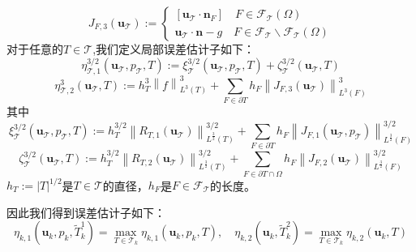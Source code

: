 \documentclass{article}
\begin{document}
\begin{equation*}
J_{F,3}(\boldsymbol{u}_{\mathcal{T}}):=
\begin{cases}
[\boldsymbol{u}_{\mathcal{T}}\cdot\boldsymbol{n}_F]\quad F \in \mathcal{F}_{\mathcal{T}}(\Omega)\\
\boldsymbol{u}_{\mathcal{T}}\cdot\boldsymbol{n}-g\quad F \in \mathcal{F}_{\mathcal{T}}\backslash \mathcal{F}_{\mathcal{T}}(\Omega)
\end{cases}
\end{equation*}
对于任意的$T\in\mathcal{T}$,我们定义局部误差估计子如下：
\begin{equation*}
\eta_{\mathcal{T},1}^{3/2}(\boldsymbol{u}_{\mathcal{T}},p_{\mathcal{T}},T):=\xi_{\mathcal{T}}^{3/2}(\boldsymbol{u}_{\mathcal{T}},p_{\mathcal{T}},T)+\zeta_{\mathcal{T}}^{3/2}(\boldsymbol{u}_{\mathcal{T}},T)
\end{equation*}
\begin{equation*}
\eta_{\mathcal{T},2}^3(\boldsymbol{u}_{\mathcal{T}},T):=h_T^3\left\|f\right\|_{L^3(T)}^3+\sum\limits_{F\in\partial T}h_F\left\|J_{F,3}(\boldsymbol{u}_{\mathcal{T}})\right\|_{L^3(F)}^3
\end{equation*}
其中
\begin{equation*}
\xi_{\mathcal{T}}^{3/2}(\boldsymbol{u}_{\mathcal{T}},p_{\mathcal{T}},T):=h_{T}^{3/2}\left\|R_{T,1}(\boldsymbol{u}_{\mathcal{T}})\right\|_{L^{\frac{3}{2}}(T)}^{3/2}+\sum\limits_{F\in\partial T}h_F\left\|J_{F,1}(\boldsymbol{u}_{\mathcal{T}},p_{\mathcal{T}})\right\|_{L^{\frac{3}{2}}(F)}^{3/2}
\end{equation*}
\begin{equation*}
\zeta_{\mathcal{T}}^{3/2}(\boldsymbol{u}_{\mathcal{T}},T):=h_{T}^{3/2}\left\|R_{T,2}(\boldsymbol{u}_{\mathcal{T}})\right\|_{L^{\frac{3}{2}}(T)}^{3/2}+\sum\limits_{F\in\partial T\cap\Omega}h_F\left\|J_{F,2}(\boldsymbol{u}_{\mathcal{T}})\right\|_{L^{\frac{3}{2}}(F)}^{3/2}
\end{equation*}
$h_T:=\left|T\right|^{1/2}$是$T\in\mathcal{T}$的直径，$h_F$是$F\in\mathcal{F}_{\mathcal{T}}$的长度。

因此我们得到误差估计子如下：
\begin{equation*}
\eta_{k,1}(\boldsymbol{u}_k,p_k,\tilde{T}_k^1)=\max\limits_{T\in\mathcal{T}_k}\eta_{k,1}(\boldsymbol{u}_k,p_k,T),\quad\eta_{k,2}(\boldsymbol{u}_k,\tilde{T}_k^2)=\max\limits_{T\in\mathcal{T}_k}\eta_{k,2}(\boldsymbol{u}_k,T)
\end{equation*}






\nocite{*}

\end{document}
